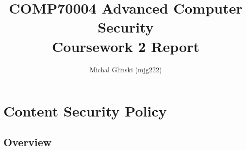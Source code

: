\documentclass[11]{article}   %
\begin{document}
\title{COMP70004 Advanced Computer Security\\Coursework 2 Report} 
\author{Michal Glinski (mjg222)}    

\maketitle

\section{Content Security Policy}
\subsection{Overview}
%
%
%
%
\end{document}
